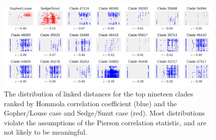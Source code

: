 \begin{figure}
    \includegraphics[width=\textwidth]{FishPoo/figures/High_correlation_clades.png}
    \caption{The distribution of linked distances for the top nineteen clades ranked by Hommola correlation coefficient (blue) and the Gopher/Louse case and Sedge/Smut case (red). Most distributions violate the assumptions of the Pierson correlation statistic, and are not likely to be meaningful. }
    \label{FP_highcorr}
\end{figure}
